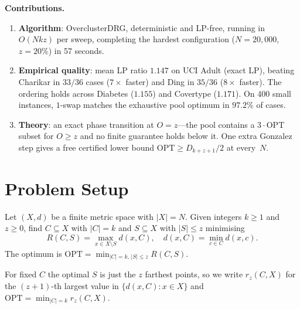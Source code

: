 \documentclass[twoside,leqno,twocolumn]{article}
\newcommand{\OPT}{\mathrm{OPT}}
\newcommand{\rz}{r_z}
\begin{document}
\smallskip\noindent\textbf{Contributions.}
\begin{enumerate}[leftmargin=*]
  \item \textbf{Algorithm}: OverclusterDRG, deterministic and LP-free,
  running in $O(Nkz)$ per sweep, completing the hardest configuration
  ($N=20{,}000$, $z=20\%$) in 57 seconds.
  \item \textbf{Empirical quality}: mean LP ratio $1.147$ on UCI Adult
  (exact LP), beating Charikar in $33/36$ cases ($7\times$ faster) and
  Ding in $35/36$ ($8\times$ faster). The ordering holds across
  Diabetes ($1.155$) and Covertype ($1.171$). On 400 small instances,
  $1$-swap matches the exhaustive pool optimum in $97.2\%$ of cases.
  \item \textbf{Theory}: an exact phase transition at $O=z$---the pool
  contains a $3\cdot\OPT$ subset for $O\ge z$ and no finite guarantee
  holds below it. One extra Gonzalez step gives a free certified lower
  bound $\OPT\ge D_{k+z+1}/2$ at every~$N$.
\end{enumerate}


\section{Problem Setup}
\label{sec:setup}

Let $(X,d)$ be a finite metric space with $|X|=N$. Given integers
$k\ge1$ and $z\ge0$, find $C\subseteq X$ with $|C|=k$ and
$S\subseteq X$ with $|S|\le z$ minimising
\[
  R(C,S) = \max_{x\in X\setminus S} d(x,C), \quad
  d(x,C)=\min_{c\in C}d(x,c).
\]
The optimum is $\OPT=\min_{|C|=k,\,|S|\le z}R(C,S)$.

For fixed $C$ the optimal $S$ is just the $z$ farthest points, so we
write $\rz(C,X)$ for the $(z{+}1)$-th largest value in
$\{d(x,C):x\in X\}$ and $\OPT=\min_{|C|=k}\rz(C,X)$.
\end{document}

